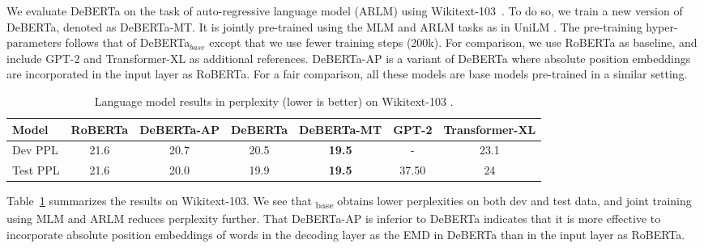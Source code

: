 We evaluate DeBERTa on the task of auto-regressive language model (ARLM) using Wikitext-103~\citep{merity2016pointer}. 
To do so, we train a new version of DeBERTa, denoted as DeBERTa-MT. 
It is jointly pre-trained using the MLM and ARLM tasks as in UniLM \citep{dong2019unilm}. 
The pre-training hyper-parameters follows that of DeBERTa$_{base}$ except that we use fewer training steps (200k). For comparison, we use RoBERTa as baseline, and include GPT-2 and Transformer-XL as additional references.  
DeBERTa-AP is a variant of DeBERTa where absolute position embeddings are incorporated in the input layer as RoBERTa. 
For a fair comparison, all these models are base models pre-trained in a similar setting.

\begin{table}[htb!]
    \centering
    \begin{tabular}{@{\hskip2pt}l|@{\hskip2pt} c @{\hskip2pt}|@{\hskip2pt} c @{\hskip2pt}| c@{\hskip2pt} |@{\hskip2pt}c@{\hskip2pt}|@{\hskip2pt} c@{\hskip2pt}|@{\hskip2pt}c @{\hskip2pt}}
        \toprule
        {\bf Model} &{RoBERTa}& {DeBERTa-AP} & {DeBERTa} & {DeBERTa-MT} &{GPT-2} &{Transformer-XL}  \\ 
        \midrule
        Dev PPL & 21.6 & 20.7 & 20.5 & \textbf{19.5} & -& 23.1  \\ \hline
        Test PPL & 21.6 & 20.0 & 19.9 & \textbf{19.5} &  37.50& 24  \\
        \bottomrule
        \end{tabular}
    \caption{
    Language model results in perplexity (lower is better) on Wikitext-103 . 
    }
    \label{tab:wiki}
\end{table}
Table~\ref{tab:wiki} summarizes the results on Wikitext-103. 
We see that {\ModelName}\textsubscript{base} obtains lower perplexities on both dev and test data, and joint training using MLM and ARLM reduces perplexity further. %
That DeBERTa-AP is inferior to DeBERTa indicates that it is more effective to incorporate absolute position embeddings of words in the decoding layer as the EMD in DeBERTa than in the input layer as RoBERTa.

